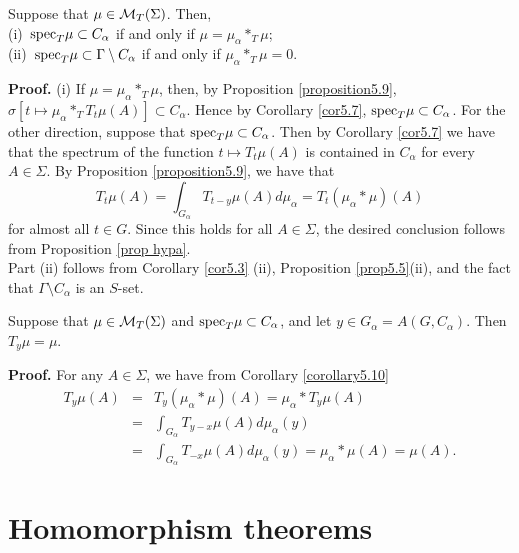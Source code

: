 \documentclass[12pt,leqno]{article}
\def\cMT{{\cal M}_T(\Sigma)}
\begin{document}
\begin{cor}
Suppose that $\mu\in\cMT$.  Then,\\
(i)\ ${\rm spec}_T \mu\subset C_\alpha$ if and only if
$\mu=\mu_\alpha *_T \mu$;\\
%
%
%
(ii)\      ${\rm spec}_T \mu\subset \Gamma\setminus C_\alpha$ 
if and only if
%
%
%
%
$\mu_\alpha *_T \mu=0$.
\label{corollary5.10}
\end{cor}
{\bf Proof.}  (i)  If $\mu=\mu_\alpha*_T\mu$,
then, by Proposition \ref{proposition5.9}, 
$\sigma[t\mapsto \mu_\alpha*_T T_t\mu(A)]\subset C_\alpha$.
Hence by Corollary \ref{cor5.7}, ${\rm spec}_T \mu\subset C_\alpha$.  
For the other direction, suppose that 
${\rm spec}_T \mu\subset C_\alpha$.  Then by Corollary \ref{cor5.7}
we have that the spectrum of the function
$t\mapsto T_t\mu (A)$ is contained in $C_\alpha$
for every $A\in \Sigma$.  By Proposition \ref{proposition5.9}, 
we have that
$$T_t\mu(A)=\int_{G_\alpha}T_{t-y}\mu (A) d\mu_\alpha=
T_t(\mu_\alpha*\mu)(A)$$
for almost all $t\in G$.  Since this holds for all $A\in\Sigma$,
the desired conclusion
follows from Proposition \ref{prop hypa}.\\
Part (ii) follows from Corollary \ref{cor5.3} (ii), Proposition
\ref{prop5.5}(ii), and the fact that $\Gamma\setminus C_\alpha$
is an $S$-set.
\begin{cor}
Suppose that $\mu\in \cMT$ and 
${\rm spec}_T\mu \subset C_\alpha$,
and let $y\in G_\alpha=A(G,C_\alpha)$.  Then
$T_y\mu=\mu$.
\label{cor5.11}
\end{cor}
{\bf Proof.}  For any $A\in \Sigma$, we have from Corollary 
\ref{corollary5.10}
\begin{eqnarray*}
T_y\mu (A)
		&=&
T_y(\mu_\alpha *\mu)(A)=\mu_\alpha*T_y\mu(A)\\
		&=&
\int_{G_\alpha} T_{y-x} \mu (A) d\mu_\alpha (y)\\
		&=&
\int_{G_\alpha}T_{-x}\mu(A) d\mu_\alpha (y) 
=\mu_\alpha *\mu(A)=\mu(A).
\end{eqnarray*}



\section{Homomorphism theorems}
\end{document}
